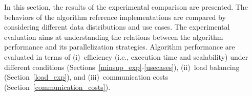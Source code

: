 
In this section, the results of the experimental comparison are presented.
The behaviors of the algorithm reference implementations are compared
by considering different data distributions and use cases. 
The experimental evaluation aims at understanding the relations between 
the algorithm performance 
and its parallelization strategies. 
Algorithm performance are evaluated in terms of
(i)~efficiency (i.e., execution time and scalability) under different conditions
(Sections~\ref{minsup_exp}-\ref{usecases}),
(ii)~load balancing (Section~\ref{load_exp}), and
(iii)~communication costs (Section~\ref{communication_costs}).


